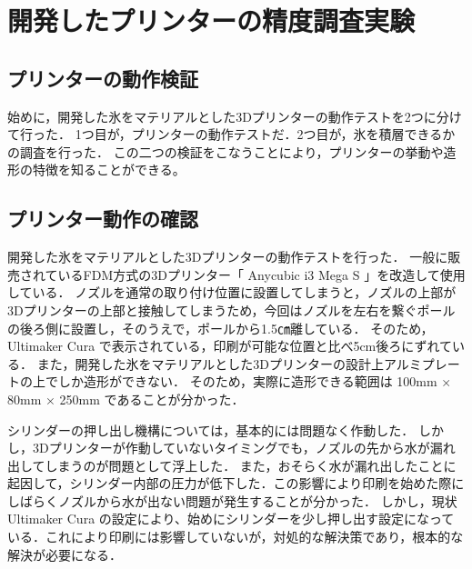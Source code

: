 \chapter{開発したプリンターの精度調査実験}
\label{chp:first}

\section{プリンターの動作検証}
\label{sec:paragraph}
始めに，開発した氷をマテリアルとした3Dプリンターの動作テストを2つに分けて行った．
1つ目が，プリンターの動作テストだ．2つ目が，氷を積層できるかの調査を行った．
この二つの検証をこなうことにより，プリンターの挙動や造形の特徴を知ることができる。

\section{プリンター動作の確認}
\label{sec:paragraph}
開発した氷をマテリアルとした3Dプリンターの動作テストを行った．
一般に販売されているFDM方式の3Dプリンター「 Anycubic i3 Mega S 」を改造して使用している．
ノズルを通常の取り付け位置に設置してしまうと，ノズルの上部が3Dプリンターの上部と接触してしまうため，今回はノズルを左右を繋ぐポールの後ろ側に設置し，そのうえで，ポールから1.5㎝離している．
そのため， Ultimaker Cura で表示されている，印刷が可能な位置と比べ5cm後ろにずれている．
また，開発した氷をマテリアルとした3Dプリンターの設計上アルミプレートの上でしか造形ができない．
そのため，実際に造形できる範囲は 100mm × 80mm × 250mm であることが分かった．

シリンダーの押し出し機構については，基本的には問題なく作動した．
しかし，3Dプリンターが作動していないタイミングでも，ノズルの先から水が漏れ出してしまうのが問題として浮上した．
また，おそらく水が漏れ出したことに起因して，シリンダー内部の圧力が低下した．この影響により印刷を始めた際にしばらくノズルから水が出ない問題が発生することが分かった．
しかし，現状 Ultimaker Cura の設定により、始めにシリンダーを少し押し出す設定になっている．これにより印刷には影響していないが，対処的な解決策であり，根本的な解決が必要になる．


